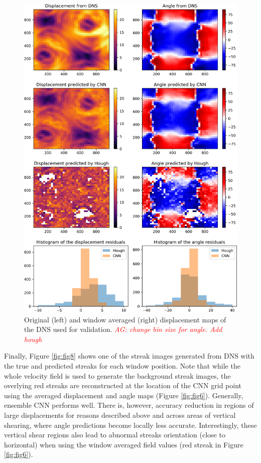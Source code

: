 \documentclass{svjour3}                     %
\newcommand{\new}[1]{\textit{\textcolor{red}{#1}}}
\begin{document}
\begin{figure}
\includegraphics[width=\textwidth]{figs/figure6.png}
\caption{Original (left) and window averaged (right) displacement maps of the DNS \cite{plumley2016effects} used for validation. \new{AG: change bin size for angle. Add hough}}
\label{fig:fig7}
\end{figure}

Finally, Figure \ref{fig:fig8} shows one of the streak images generated from DNS with the true and predicted streaks for each window position. Note that while the whole velocity field is used to generate the background streak images, the overlying red streaks are reconstructed at the location of the CNN grid point using the averaged displacement and angle maps (Figure \ref{fig:fig6}). Generally, ensemble CNN performs well. There is, however, accuracy reduction in regions of large displacements for reasons described above and across areas of vertical shearing, where angle predictions become locally less accurate. Interestingly, these vertical shear regions also lead to abnormal streaks orientation (close to horizontal) when using the window averaged field values (red streak in Figure \ref{fig:fig6}).
\end{document}
